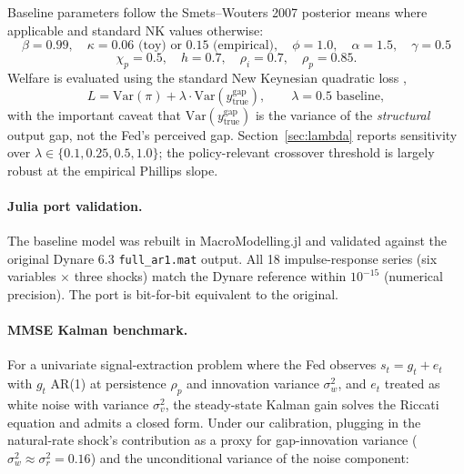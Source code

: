 \documentclass[12pt]{article}
\begin{document}
Baseline parameters follow the Smets--Wouters 2007 posterior means where applicable and standard NK values otherwise:
\[
\beta = 0.99, \quad \kappa = 0.06\text{ (toy) or } 0.15\text{ (empirical)}, \quad \phi = 1.0, \quad \alpha = 1.5, \quad \gamma = 0.5
\]
\[
\chi_p = 0.5, \quad h = 0.7, \quad \rho_i = 0.7, \quad \rho_p = 0.85.
\]
Welfare is evaluated using the standard New Keynesian quadratic loss \citep{woodford2003},
\begin{equation}
L = \mathrm{Var}(\pi) + \lambda \cdot \mathrm{Var}(y^{\text{gap}}_{\text{true}}), \qquad \lambda = 0.5 \text{ baseline},
\end{equation}
with the important caveat that \(\mathrm{Var}(y^{\text{gap}}_{\text{true}})\) is the variance of the \emph{structural} output gap, not the Fed's perceived gap. Section~\ref{sec:lambda} reports sensitivity over \(\lambda \in \{0.1, 0.25, 0.5, 1.0\}\); the policy-relevant crossover threshold is largely robust at the empirical Phillips slope.

\paragraph{Julia port validation.}
The baseline model was rebuilt in MacroModelling.jl and validated against the original Dynare 6.3 \texttt{full\_ar1.mat} output. All 18 impulse-response series (six variables \(\times\) three shocks) match the Dynare reference within \(10^{-15}\) (numerical precision). The port is bit-for-bit equivalent to the original.

\paragraph{MMSE Kalman benchmark.}\label{sec:mmse}
For a univariate signal-extraction problem where the Fed observes \(s_t = g_t + e_t\) with \(g_t\) AR(1) at persistence \(\rho_p\) and innovation variance \(\sigma_w^2\), and \(e_t\) treated as white noise with variance \(\sigma_v^2\), the steady-state Kalman gain solves the Riccati equation and admits a closed form. Under our calibration, plugging in the natural-rate shock's contribution as a proxy for gap-innovation variance (\(\sigma_w^2 \approx \sigma_r^2 = 0.16\)) and the unconditional variance of the noise component:
\end{document}
